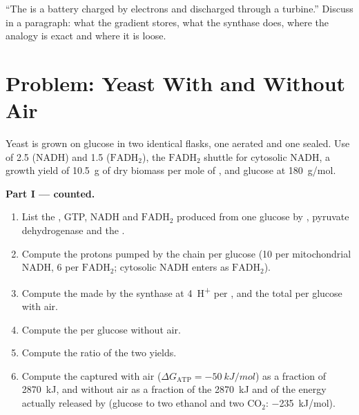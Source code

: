 \begin{exercise}[$\star\star\star$]\label{exo:b1:respiration-fermentation:12}
``The  is a battery charged by electrons and discharged
through a turbine.'' Discuss in a paragraph: what the gradient stores,
what the synthase does, where the analogy is exact and where it is
loose.
\end{exercise}

\section{Problem: Yeast With and Without Air}

\begin{problem}
\label{pb:b1:respiration-fermentation:1}
Yeast is grown on glucose in two identical flasks, one aerated and one
sealed. Use  of 2.5 (NADH) and 1.5 ($\mathrm{FADH_2}$), the
$\mathrm{FADH_2}$ shuttle for cytosolic NADH, a growth yield of
\qty{10.5}{g} of dry biomass per mole of , and glucose at
\qty{180}{g/mol}.

\medskip
\noindent\textbf{Part I ---  counted.}
\begin{enumerate}
  \item List the , GTP, NADH and $\mathrm{FADH_2}$ produced from one
        glucose by , pyruvate dehydrogenase and the .
  \item Compute the protons pumped by the chain per glucose (10 per
        mitochondrial NADH, 6 per $\mathrm{FADH_2}$; cytosolic NADH
        enters as $\mathrm{FADH_2}$).
  \item Compute the  made by the synthase at \qty{4}{H^+} per ,
        and the total  per glucose with air.
  \item Compute the  per glucose without air.
  \item Compute the ratio of the two yields.
  \item Compute the  captured with air ($\Delta G_{\text{ATP}}
        = \qty{-50}{kJ/mol}$) as a fraction of \qty{2870}{kJ}, and
        without air as a fraction of the \qty{2870}{kJ} and of the
        energy actually released by  (glucose to two
        ethanol and two $\mathrm{CO_2}$: \qty{-235}{kJ/mol}).
\end{enumerate}


\end{problem}
